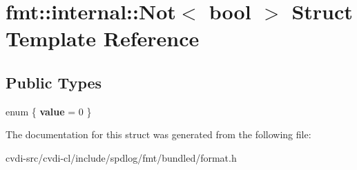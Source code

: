 \hypertarget{structfmt_1_1internal_1_1Not}{}\section{fmt\+:\+:internal\+:\+:Not$<$ bool $>$ Struct Template Reference}
\label{structfmt_1_1internal_1_1Not}
\subsection*{Public Types}
\begin{DoxyCompactItemize}
\item 
enum \{ {\bfseries value} = 0
 \}\hypertarget{structfmt_1_1internal_1_1Not_a878274638da25a62562a1d52b4053bf0}{}\label{structfmt_1_1internal_1_1Not_a878274638da25a62562a1d52b4053bf0}

\end{DoxyCompactItemize}


The documentation for this struct was generated from the following file\+:\begin{DoxyCompactItemize}
\item 
cvdi-\/src/cvdi-\/cl/include/spdlog/fmt/bundled/format.\+h\end{DoxyCompactItemize}
